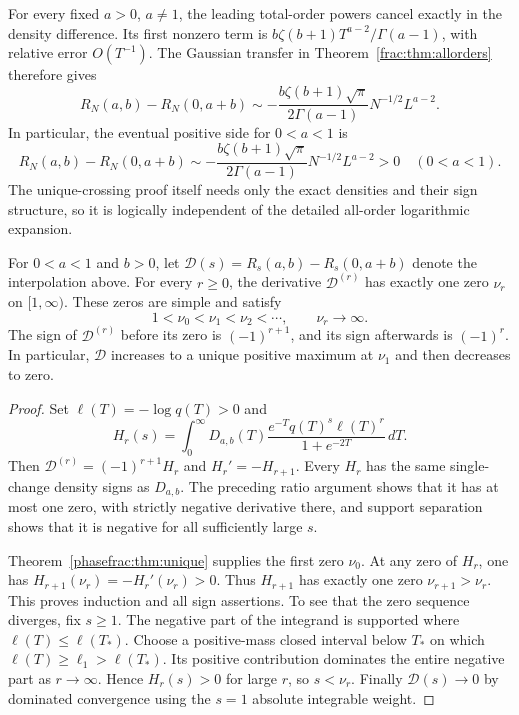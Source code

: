 For every fixed $a>0$, $a\ne1$, the leading total-order powers
cancel exactly in the density difference. Its first nonzero term is
$b\zeta(b+1)T^{a-2}/\Gamma(a-1)$, with relative error $O(T^{-1})$.
The Gaussian transfer in Theorem~\ref{frac:thm:allorders} therefore gives
\begin{equation}\label{phasefrac:eq:genericscale}
 R_N(a,b)-R_N(0,a+b)
 \sim-\frac{b\zeta(b+1)\sqrt\pi}{2\Gamma(a-1)}N^{-1/2}L^{a-2}.
\end{equation}
In particular, the eventual positive side for $0<a<1$ is
\[
 R_N(a,b)-R_N(0,a+b)
 \sim-\frac{b\zeta(b+1)\sqrt\pi}{2\Gamma(a-1)}
             N^{-1/2}L^{a-2}>0\quad(0<a<1).
\]
The unique-crossing proof itself needs only the exact densities and
their sign structure, so it is logically independent of the detailed
all-order logarithmic expansion.

\begin{corollary}
\label{phasefrac:cor:derivatives}
For $0<a<1$ and $b>0$, let
$\mathcal D(s)=R_s(a,b)-R_s(0,a+b)$ denote the interpolation above.
For every $r\ge0$, the derivative $\mathcal D^{(r)}$ has exactly one
zero $\nu_r$ on $[1,\infty)$. These zeros are simple and satisfy
\[
 1<\nu_0<\nu_1<\nu_2<\cdots,\qquad \nu_r\longrightarrow\infty.
\]
The sign of $\mathcal D^{(r)}$ before its zero is $(-1)^{r+1}$,
and its sign afterwards is $(-1)^r$. In particular, $\mathcal D$
increases to a unique positive maximum at $\nu_1$ and then decreases
to zero.
\end{corollary}
\begin{proof}
Set $\ell(T)=-\log q(T)>0$ and
\[
 H_r(s)=\int_0^\infty D_{a,b}(T)
 \frac{e^{-T}q(T)^s\ell(T)^r}{1+e^{-2T}}\,dT.
\]
Then $\mathcal D^{(r)}=(-1)^{r+1}H_r$ and $H_r'=-H_{r+1}$.
Every $H_r$ has the same single-change density signs as $D_{a,b}$.
The preceding ratio argument shows that it has at most one zero,
with strictly negative derivative there, and support separation shows
that it is negative for all sufficiently large $s$.

Theorem~\ref{phasefrac:thm:unique} supplies the first zero $\nu_0$.
At any zero of $H_r$, one has
$H_{r+1}(\nu_r)=-H_r'(\nu_r)>0$. Thus $H_{r+1}$ has exactly one
zero $\nu_{r+1}>\nu_r$. This proves induction and all sign assertions.
To see that the zero sequence diverges, fix $s\ge1$. The negative
part of the integrand is supported where $\ell(T)\le\ell(T_*)$.
Choose a positive-mass closed interval below $T_*$ on which
$\ell(T)\ge\ell_1>\ell(T_*)$. Its positive contribution dominates
the entire negative part as $r\to\infty$. Hence $H_r(s)>0$ for
large $r$, so $s<\nu_r$. Finally $\mathcal D(s)\to0$ by dominated
convergence using the $s=1$ absolute integrable weight.
\end{proof}

